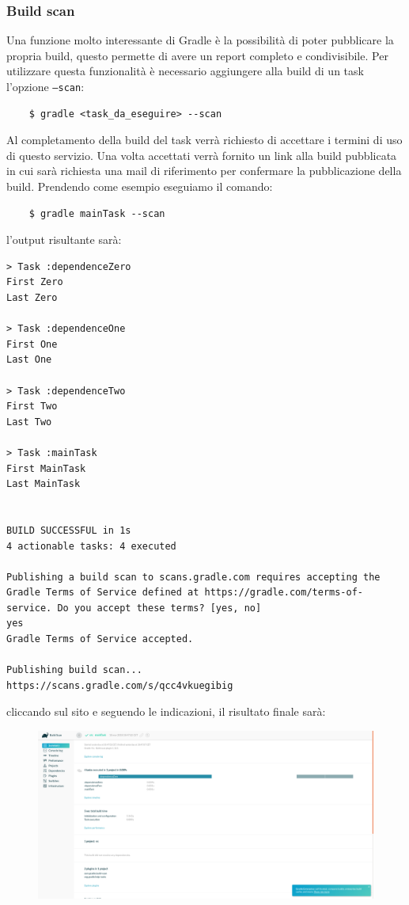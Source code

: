 \subsubsection{Build scan}
Una funzione molto interessante di Gradle è la possibilità di poter pubblicare la propria build, questo permette di avere un report completo e condivisibile. Per utilizzare questa funzionalità è necessario aggiungere alla build di un task l'opzione \texttt{--scan}:
\begin{verbatim}    $ gradle <task_da_eseguire> --scan \end{verbatim}
Al completamento della build del task verrà richiesto di accettare i termini di uso di questo servizio. Una volta accettati verrà fornito un link alla build pubblicata in cui sarà richiesta una mail di riferimento per confermare la pubblicazione della build. Prendendo come esempio eseguiamo il comando:
\begin{verbatim}
    $ gradle mainTask --scan\end{verbatim}
l'output risultante sarà:
\begin{verbatim}
> Task :dependenceZero 
First Zero
Last Zero

> Task :dependenceOne 
First One
Last One

> Task :dependenceTwo 
First Two
Last Two

> Task :mainTask 
First MainTask
Last MainTask


BUILD SUCCESSFUL in 1s
4 actionable tasks: 4 executed

Publishing a build scan to scans.gradle.com requires accepting the Gradle Terms of Service defined at https://gradle.com/terms-of-service. Do you accept these terms? [yes, no] 
yes
Gradle Terms of Service accepted.

Publishing build scan...
https://scans.gradle.com/s/qcc4vkuegibig
\end{verbatim}
cliccando sul sito e seguendo le indicazioni, il risultato finale sarà:
\begin{figure}[H]
\includegraphics[scale=0.25]{HowToUse/1Task/insights/gradleScan.png}
\end{figure}